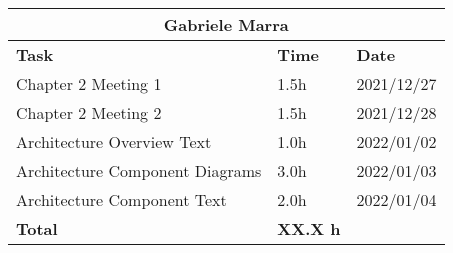 \begin{table}[H]
\centering
\begin{tabular}{|p{}|p{}|p{}|}
\hline
\multicolumn{3}{|c|}{\textbf{Gabriele Marra}}            \\ \hline
\textbf{Task}                   & \textbf{Time} & \textbf{Date} \\ \hline

Chapter 2 Meeting 1				&		1.5h	   &	2021/12/27 \\ \hline
Chapter 2 Meeting 2				&		1.5h	   &	2021/12/28 \\ \hline
Architecture Overview Text		&		1.0h	   &	2022/01/02 \\ \hline
Architecture Component Diagrams	&		3.0h	   &	2022/01/03 \\ \hline
Architecture Component Text		&		2.0h	   &	2022/01/04 \\ \hline

\textbf{Total}                  		&  \textbf{XX.X h}   & \\ \hline
\end{tabular}
\end{table}
